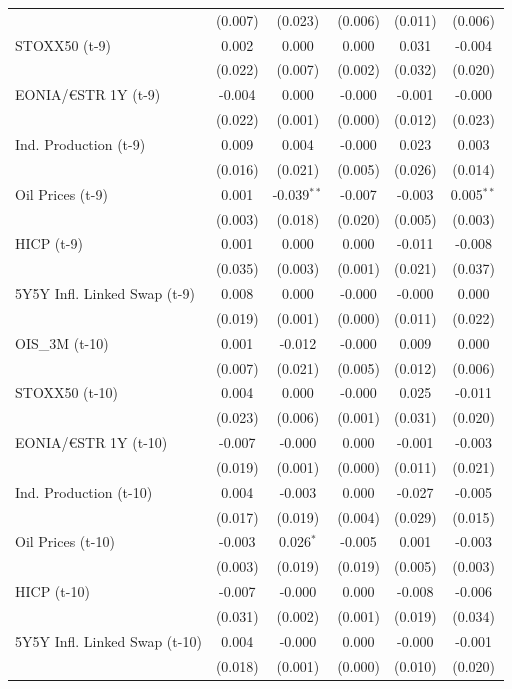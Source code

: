 \begin{longtable}[t]{lccccc}
 & (0.007) & (0.023) & (0.006) & (0.011) & (0.006)\\
STOXX50 (t-9) & 0.002 & 0.000 & 0.000 & 0.031 & -0.004\\
 & (0.022) & (0.007) & (0.002) & (0.032) & (0.020)\\
EONIA/€STR 1Y (t-9) & -0.004 & 0.000 & -0.000 & -0.001 & -0.000\\
 & (0.022) & (0.001) & (0.000) & (0.012) & (0.023)\\
Ind. Production (t-9) & 0.009 & 0.004 & -0.000 & 0.023 & 0.003\\
 & (0.016) & (0.021) & (0.005) & (0.026) & (0.014)\\
Oil Prices (t-9) & 0.001 & -0.039$^{**}$ & -0.007 & -0.003 & 0.005$^{**}$\\
 & (0.003) & (0.018) & (0.020) & (0.005) & (0.003)\\
HICP (t-9) & 0.001 & 0.000 & 0.000 & -0.011 & -0.008\\
 & (0.035) & (0.003) & (0.001) & (0.021) & (0.037)\\
5Y5Y Infl. Linked Swap (t-9) & 0.008 & 0.000 & -0.000 & -0.000 & 0.000\\
 & (0.019) & (0.001) & (0.000) & (0.011) & (0.022)\\
OIS\_3M (t-10) & 0.001 & -0.012 & -0.000 & 0.009 & 0.000\\
 & (0.007) & (0.021) & (0.005) & (0.012) & (0.006)\\
STOXX50 (t-10) & 0.004 & 0.000 & -0.000 & 0.025 & -0.011\\
 & (0.023) & (0.006) & (0.001) & (0.031) & (0.020)\\
EONIA/€STR 1Y (t-10) & -0.007 & -0.000 & 0.000 & -0.001 & -0.003\\
 & (0.019) & (0.001) & (0.000) & (0.011) & (0.021)\\
Ind. Production (t-10) & 0.004 & -0.003 & 0.000 & -0.027 & -0.005\\
 & (0.017) & (0.019) & (0.004) & (0.029) & (0.015)\\
Oil Prices (t-10) & -0.003 & 0.026$^{*}$ & -0.005 & 0.001 & -0.003\\
 & (0.003) & (0.019) & (0.019) & (0.005) & (0.003)\\
HICP (t-10) & -0.007 & -0.000 & 0.000 & -0.008 & -0.006\\
 & (0.031) & (0.002) & (0.001) & (0.019) & (0.034)\\
5Y5Y Infl. Linked Swap (t-10) & 0.004 & -0.000 & 0.000 & -0.000 & -0.001\\
 & (0.018) & (0.001) & (0.000) & (0.010) & (0.020)\\

\end{longtable}
